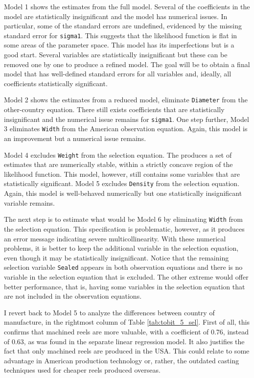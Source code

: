 Model 1 shows the estimates from the full model. 
Several of the coefficients in the model are 
statistically insignificant and the model has numerical issues.
In particular, some of the standard errors are undefined,
evidenced by the missing standard error for \texttt{sigma1}.
This suggests that the likelihood function is flat in some areas
of the parameter space.
%
This model has its imperfections but is a good start.
Several variables are statistically insignificant
but these can be removed one by one
to produce a refined model.
%
The goal will be to obtain a final model that has
well-defined standard errors for all variables
and, ideally, all coefficients statistically significant.


Model 2 shows the estimates from a reduced model,
eliminate \texttt{Diameter} from the other-country equation.
There still exists coefficients that are statistically insignificant
and the numerical issue remains for \texttt{sigma1}. 
One step further, Model 3
eliminates \texttt{Width} from the American observation equation.
Again, this model is an improvement but a numerical issue remains. 

Model 4 excludes \texttt{Weight} from the selection equation.
The produces a set of estimates that are numerically stable, 
within a strictly concave region of the likelihood function. 
This model, however, still contains
some variables that are statistically significant.
Model 5 excludes \texttt{Density} from the selection equation.
Again, this model is well-behaved numerically
but one statistically insignificant variable remains.

The next step is to estimate what would be Model 6
by eliminating \texttt{Width} from the selection equation.
This specification is problematic, however, 
as it produces an error message indicating severe multicollinearity. 
% 
With these numerical problems,
it is better to keep the additional variable
in the selection equation,
even though it may be statistically insignificant.
Notice that the remaining selection variable \texttt{Sealed}
appears in both observation equations and there is no
variable in the selection equation that is excluded.
The other extreme would offer better performance,
that is, having some variables in the selection
equation that are not included in the observation equations.




\pagebreak

I revert back to Model 5 to analyze the differences
between country of manufacture, 
in the rightmost column of Table \ref{tab:tobit_5_sel}.
% 
First of all, this confirms that machined reels
are more valuable, with a coefficient of 0.76, instead of 0.63,
as was found in the separate linear regression model.
It also justifies the fact that only machined reels
are produced in the USA.
This could relate to some advantage in American production
technology or, rather, the outdated casting techniques
used for cheaper reels produced overseas.

